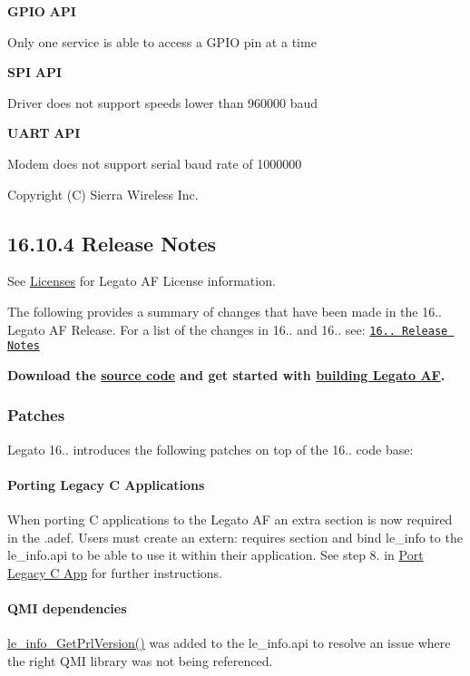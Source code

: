 {\bfseries G\+P\+IO} {\bfseries A\+PI} 
\begin{DoxyItemize}
\item Only one service is able to access a G\+P\+IO pin at a time
\end{DoxyItemize}

{\bfseries S\+PI} {\bfseries A\+PI} 
\begin{DoxyItemize}
\item Driver does not support speeds lower than 960000 baud
\end{DoxyItemize}

{\bfseries U\+A\+RT} {\bfseries A\+PI} 
\begin{DoxyItemize}
\item Modem does not support serial baud rate of 1000000
\end{DoxyItemize}

Copyright (C) Sierra Wireless Inc. \hypertarget{releaseNotes16104}{}\subsection{16.10.4 Release Notes}\label{releaseNotes16104}
See \hyperlink{aboutLicenses}{Licenses} for Legato AF License information.

The following provides a summary of changes that have been made in the 16.. Legato AF Release. For a list of the changes in 16.. and 16.. see\+: \href{https://docs.legato.io/16_10/Legato_16_10_1_ReleaseNotes.pdf}{\tt 16.. Release Notes}

{\bfseries  Download the \hyperlink{aboutReleaseInfo}{source code} and get started with \hyperlink{basicBuild}{building Legato AF}. }\hypertarget{releaseNotes16104_rn16_10_4_Patches}{}\subsubsection{Patches}\label{releaseNotes16104_rn16_10_4_Patches}
Legato 16.. introduces the following patches on top of the 16.. code base\+:\hypertarget{releaseNotes16104_rn16_10_4_Patches_Porting}{}\paragraph{Porting Legacy C Applications}\label{releaseNotes16104_rn16_10_4_Patches_Porting}
When porting C applications to the Legato AF an extra section is now required in the {\ttfamily }.adef. Users must create an {\ttfamily extern\+:} {\ttfamily requires} section and bind le\+\_\+info to the le\+\_\+info.\+api to be able to use it within their application. See step 8. in \hyperlink{howToPortLegacyC}{Port Legacy C App} for further instructions.\hypertarget{releaseNotes16104_rn16_10_4_Patches_info}{}\paragraph{Q\+M\+I dependencies}\label{releaseNotes16104_rn16_10_4_Patches_info}
\hyperlink{le__info__interface_8h_ab12105ea6f654c3124ec812234e0f1fa}{le\+\_\+info\+\_\+\+Get\+Prl\+Version()} was added to the le\+\_\+info.\+api to resolve an issue where the right Q\+MI library was not being referenced.

